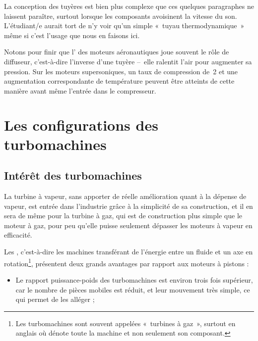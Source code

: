 		La conception des tuyères est bien plus complexe que ces quelques paragraphes ne laissent paraître, surtout lorsque les composants avoisinent la vitesse du son. L’étudiant/e aurait tort de n’y voir qu’un simple «~tuyau thermodynamique~» même si c’est l’usage que nous en faisons ici.

		Notons pour finir que l’ des moteurs aéronautiques joue souvent le rôle de diffuseur, c’est-à-dire l’inverse d’une tuyère --\ elle ralentit l’air pour augmenter sa pression. Sur les moteurs supersoniques, un taux de compression de~2 et une augmentation correspondante de température peuvent être atteints de cette manière avant même l’entrée dans le compresseur.


\section{Les configurations des turbomachines}
\label{ch_configurations_turbomachines}


	\subsection{Intérêt des turbomachines}

			La turbine à vapeur, sans apporter de réelle amélioration quant à la dépense de vapeur, est entrée dans l’industrie grâce à la simplicité de sa construction, et il en sera de même pour la turbine à gaz, qui est de construction plus simple que le moteur à gaz, pour peu qu’elle puisse seulement dépasser les moteurs à vapeur en efficacité.

		Les , c’est-à-dire les machines transférant de l’énergie entre un fluide et un axe en rotation\footnote{Les turbomachines sont souvent appelées «~turbines à gaz~», surtout en anglais où  dénote toute la machine et non seulement son composant.}, présentent deux grands avantages par rapport aux moteurs à pistons :

		\begin{itemize}
			\item Le rapport puissance-poids des turbomachines est environ trois fois supérieur, car le nombre de pièces mobiles est réduit, et leur mouvement très simple, ce qui permet de les alléger ;
		\end{itemize} %
		
